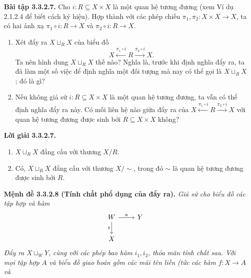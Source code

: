 \noindent\textbf{Bài tập 3.3.2.7.} Cho $i:R\subseteq X\times X$ là một quan hệ tương đương (xem Ví dụ 2.1.2.4 để biết cách ký hiệu). Hợp thành với các phép chiếu $\pi_1,\pi_2:X\times X\to X$, ta có hai ánh xạ $\pi_1\circ i:R\to X$ và $\pi_2\circ i:R\to X$.
\begin{enumerate}[label=\alph*.]
\item Xét đẩy ra $X\sqcup_RX$ của biểu đồ
\[X\xleftarrow{\pi_1\circ i}R\xrightarrow{\pi_2\circ i}X.\]
Ta nên hình dung $X\sqcup_RX$ thế nào? Nghĩa là, trước khi định nghĩa đẩy ra, ta đã làm một số việc để định nghĩa một đối tượng mà nay có thể gọi là $X\sqcup_RX$; đó là gì?
\item Nếu không giả sử $i:R\subseteq X\times X$ là một quan hệ tương đương, ta vẫn có thể định nghĩa đẩy ra này. Có mối liên hệ nào giữa đẩy ra của $X\xleftarrow{\pi_1\circ i}R\xrightarrow{\pi_2\circ i}X$ với quan hệ tương đương được sinh bởi $R\subseteq X\times X$ không?
\end{enumerate}
\noindent\textbf{Lời giải 3.3.2.7.}\keepwithnext
\begin{enumerate}[label=\alph*.]
\item $X\sqcup_RX$ đẳng cấu với thương $X/R$.
\item Có, $X\sqcup_RX$ đẳng cấu với thương $X/{\sim}$, trong đó $\sim$ là quan hệ tương đương được sinh bởi $R$.
\end{enumerate}

\noindent\textbf{Mệnh đề 3.3.2.8 (Tính chất phổ dụng của đẩy ra).} \emph{Giả sử cho biểu đồ các tập hợp và hàm}
\[\begin{tikzcd}W\arrow[r,"u"]\arrow[d,"t"']&Y\\X&\end{tikzcd}\]
\emph{Đẩy ra $X\sqcup_WY$, cùng với các phép bao hàm $i_1,i_2$, thỏa mãn tính chất sau. Với mọi tập hợp $A$ và biểu đồ giao hoán gồm các mũi tên liền (tức các hàm $f:X\to A$ và}

